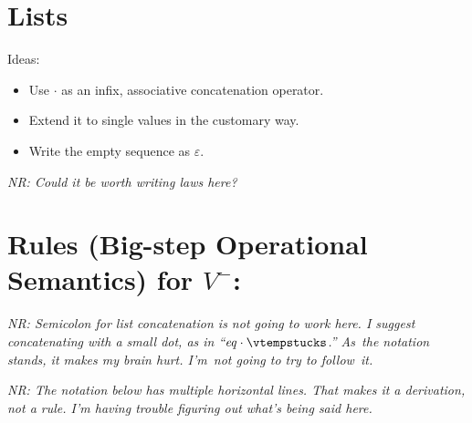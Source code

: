 \documentclass[]{article}
\newcommand\nr[1]{\leavevmode\emph{NR: #1}}
\newcommand\eq{\ensuremath{\mathit{eq}}}  %
\newcommand\emptyseq{\ensuremath{\varepsilon}}
\begin{document}
\bigskip






\section{Lists}

Ideas:
\begin{itemize} 
\item
Use $\cdot$ as an infix, associative concatenation operator.
\item
Extend it to single values in the customary way.
\item
Write the empty sequence as \emptyseq.
\end{itemize}
\nr{Could it be worth writing laws here?}


\section{Rules (Big-step Operational Semantics) for $V^{-}$:}


\nr{Semicolon for list concatenation is not going to work here.  I
suggest concatenating with a small dot, as in ``$\eq \cdot
\vtempstucks$.''
As~the notation stands, it makes my brain hurt.  I'm~not going to try
to follow~it.
}
    

\newcommand\GeCtxStuckRule[1][Left]{%
\inferrule*[#1=\textsc{ (Ge-Ctx-Stuck) }]
    {\inferrule*{}{\EquationTempStuck} 
    \and
    \inferrule*{}{\CtxToRho}
    \and 
    \inferrule*{}{\EvalGeSucc}
    }
    {\GeEqCtxEval}
}

\mpar{\GeCtxStuckRule}



\nr{The notation below has multiple horizontal lines.  That makes it a
derivation, not a rule.  I'm having trouble figuring out what's being
said here.}




\newcommand\GeEqStuckRule{%
\inferrule*[Left=\textsc{ (Ge-Eq-Succ) }]
{\GeCtxStuckRule[Right]}
{\GeCtxEqEval}
}
\end{document}
